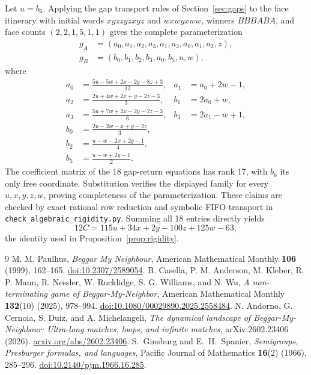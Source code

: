 \documentclass[11pt]{article}
\newcommand{\word}[1]{\texttt{#1}}
\begin{document}
Let $u=b_6$. Applying the gap transport rules of Section~\ref{sec:gaps} to
the face itinerary with initial words $xyzzyzxyz$ and $wxwyxww$, winners
$BBBABA$, and face counts $(2,2,1,5,1,1)$ gives the complete parameterization
\[
\begin{aligned}
g_A&=(a_0,a_1,a_2,a_3,a_1,a_3,a_0,a_1,a_2,z),\\
g_B&=(b_0,b_1,b_2,b_3,a_0,b_5,u,w),
\end{aligned}
\]
where
\[
\begin{aligned}
a_0&=\frac{5u-5w+2x-2y-8z+3}{12},
  &a_1&=a_0+2w-1,\\
a_2&=\frac{2u+4w+2x+y-2z-3}{3},
  &b_1&=2a_0+w,\\
a_3&=\frac{5u+7w+2x-2y-2z-3}{6},
  &b_3&=2a_1-w+1,\\
b_0&=\frac{2u-2w-x+y-2z}{3},\\
b_2&=\frac{u-w-2x+2y-1}{4},\\
b_5&=\frac{u-w+2y-1}{2}.
\end{aligned}
\]
The coefficient matrix of the 18 gap-return equations has rank 17, with
$b_6$ its only free coordinate. Substitution verifies the displayed family
for every $u,x,y,z,w$, proving completeness of the parameterization.
These claims are checked by exact rational row reduction and symbolic FIFO
transport in \word{check\_algebraic\_rigidity.py}. Summing all 18 entries
directly yields
\[
12C=115u+34x+2y-100z+125w-63,
\]
the identity used in Proposition~\ref{prop:rigidity}.

\begin{thebibliography}{9}
M. M. Paulhus,
\emph{Beggar My Neighbour},
American Mathematical Monthly \textbf{106} (1999), 162--165.
\href{https://doi.org/10.2307/2589054}{doi:10.2307/2589054}.
B. Casella, P. M. Anderson, M. Kleber, R. P. Mann, R. Nessler, W. Rucklidge, S. G. Williams, and N. Wu,
\emph{A non-terminating game of Beggar-My-Neighbor},
American Mathematical Monthly \textbf{132}(10) (2025), 978--994.
\href{https://doi.org/10.1080/00029890.2025.2558484}{doi:10.1080/00029890.2025.2558484}.
N. Andorno, G. Cernoia, S. Duiz, and A. Michelangeli,
\emph{The dynamical landscape of Beggar-My-Neighbour: Ultra-long matches, loops, and infinite matches},
arXiv:2602.23406 (2026).
\href{https://arxiv.org/abs/2602.23406}{arxiv.org/abs/2602.23406}.
S.~Ginsburg and E.~H.~Spanier,
\emph{Semigroups, Presburger formulas, and languages},
Pacific Journal of Mathematics \textbf{16}(2) (1966), 285--296.
\href{https://doi.org/10.2140/pjm.1966.16.285}{doi:10.2140/pjm.1966.16.285}.
\end{thebibliography}
\end{document}

